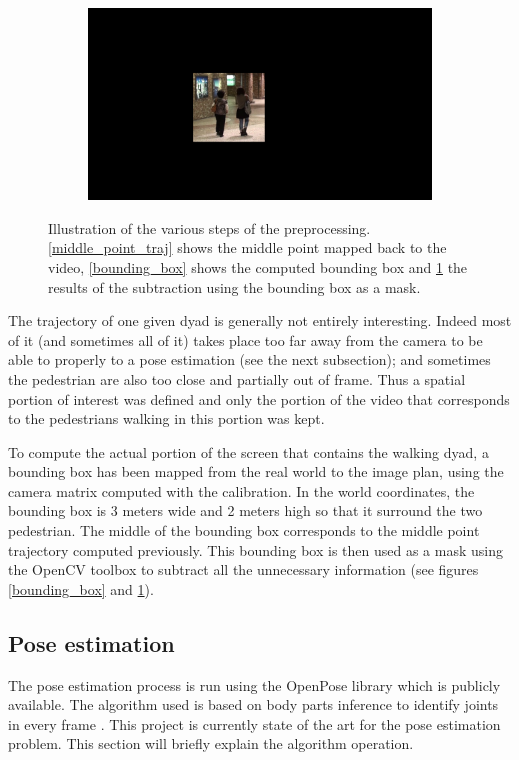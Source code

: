 \documentclass[12pt,a4paper,twoside]{article}
\begin{document}
\begin{figure}
\begin{subfigure}[b]{0.45\textwidth}
        \includegraphics[width=\textwidth]{images/masked}
        \caption{}
        \label{masked}
    \end{subfigure}
    \caption{Illustration of the various steps of the preprocessing. \ref{middle_point_traj} shows the middle point mapped back to the video, \ref{bounding_box} shows the computed bounding box and \ref{masked} the results of the subtraction using the bounding box as a mask.}\label{preprocessing}
\end{figure}

The trajectory of one given dyad is generally not entirely interesting. Indeed most of it (and sometimes all of it) takes place too far away from the camera to be able to properly to a pose estimation (see the next subsection); and sometimes the pedestrian are also too close and partially out of frame. Thus a spatial \guillemotleft portion of interest \guillemotright was defined and only the portion of the video that corresponds to the pedestrians walking in this portion was kept.

To compute the actual portion of the screen that contains the walking dyad, a bounding box has been mapped from the real world to the image plan, using the camera matrix computed with the calibration. In the world coordinates, the bounding box is 3 meters wide and 2 meters high so that it surround the two pedestrian. The middle of the bounding box corresponds to the middle point trajectory computed previously. This bounding box is then used as a mask using the OpenCV toolbox to subtract all the unnecessary information (see figures \ref{bounding_box} and \ref{masked}).

\subsection{Pose estimation}
The pose estimation process is run using the OpenPose library which is publicly available. The algorithm used is based on body parts inference to identify joints in every frame \cite{Cao2016}. This project is currently state of the art for the pose estimation problem. This section will briefly explain the algorithm operation.
\end{document}
